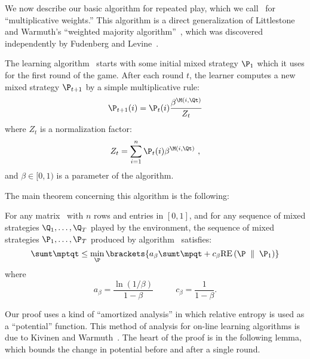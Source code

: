 We now describe our basic algorithm for repeated play, which we 
call \lwalg\ for ``multiplicative weights.''
This algorithm is a direct
generalization of Littlestone and Warmuth's ``weighted majority
algorithm''~\cite{LittlestoneWa94}, which was discovered
independently by Fudenberg and Levine~\cite{FudenbergLe95}.

The learning algorithm \lwalg\ starts with some initial mixed strategy
$\P_1$ which it
uses for the first round of the game.
After each round $t$, the learner computes a new mixed strategy
$\P_{t+1}$ by a simple multiplicative rule:
\[
   \P_{t+1}(i) = \P_{t}(i) {\beta^{\M(i,\Qt)} \over Z_t}
\]
where $Z_t$ is a normalization factor:
\[
Z_t = \sum_{i=1}^n \P_{t}(i) \beta^{\M(i,\Qt)}~,
\]
and $\beta\in [0,1)$ is a parameter of the algorithm.

The main theorem concerning this algorithm is the following:

\begin{theorem} \label{thm:lw}
For any matrix \M\ with $n$ rows and entries in $[0,1]$, and for any
sequence of mixed strategies $\Q_1,\ldots,\Q_T$ played by the
environment,
the sequence of mixed strategies $\P_1,\ldots,\P_T$
produced by algorithm \lwalg\ satisfies:
{\em
\[
   \sumt \mptqt \leq
        \minp \brackets{a_\beta \sumt \mpqt + c_\beta \RE{\P}{\P_1}}
\]
}%
where
\[
a_\beta =  \frac{\ln(1/\beta)}{1-\beta}
 \mbox{~~~~~~~~}
c_\beta = \frac{1}{1-\beta}.
\]
\end{theorem}

Our proof uses a kind of ``amortized analysis'' in which relative entropy
is used as a ``potential'' function.
This method of analysis for on-line learning algorithms is due to
Kivinen and Warmuth~\cite{KivinenWa97}.
The heart of the proof is in the following lemma, which bounds the
change in potential before and after a single round.

